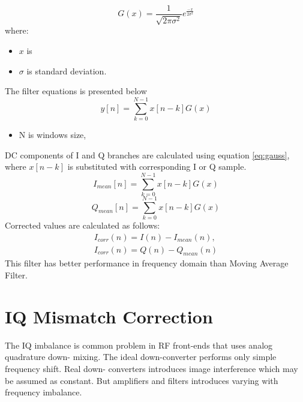 \documentclass[en,printmode]{mgr}
\begin{document}
			\[
				G(x) = \frac{1}{ \sqrt{2\pi \sigma^2}}e^{\frac{-x}{2\sigma^2}}
			\]
			where:
			\begin{itemize}
				\item $x$ is 
				\item $\sigma$ is standard deviation. 
			\end{itemize}
			
			The filter equations is presented below \cite{filter_design}
			\begin{equation}
				y[n] = \sum_{k=0}^{N-1}x[n-k]G(x) \label{eq:gauss}
			\end{equation}
			\begin{itemize}
				\item N is windows size,
			\end{itemize}	
			DC components of I and Q branches are calculated using equation \ref{eq:gauss},
			where $x[n-k]$ is substituted with corresponding I or Q sample.
			\[
				I_{mean}[n] = \sum_{k=0}^{N-1}x[n-k]G(x)
			\]
			\[
				Q_{mean}[n] = \sum_{k=0}^{N-1}x[n-k]G(x)
			\]		
			Corrected values are calculated as follows:
			\[
			\renewcommand*{\arraystretch}{1.3} 
			\begin{array}{ll}
				I_{corr}(n) = I(n) - I_{mean}(n), \\
				I_{corr}(n) = Q(n) - Q_{mean}(n)
			\end{array}
			\]
			This filter has better performance in frequency domain than Moving Average Filter.
			
	\section{IQ Mismatch Correction}
		The IQ imbalance is common problem in RF front-ends that uses analog quadrature down-
		mixing. The ideal down-converter performs only simple frequency shift. Real down-
	    converters introduces image interference which may be assumed as constant. But amplifiers
	    and filters introduces varying with frequency imbalance.
	    
\end{document}
